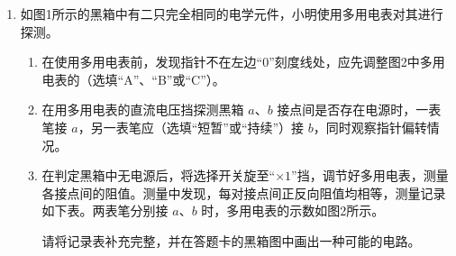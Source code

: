\documentclass[\gkver]{gaokaozhenti}
\begin{document}
\begin{enumerate}
{若粒子落在A点的右侧，其速度一定大于 $v_{0}$}
{若粒子落在A点左右两侧 $d$ 的范围内，其速度不可能小于 $v_{0}-\frac{qBd}{2m}$}
{若粒子落在A点左右两侧 $d$ 的范围内，其速度不可能大于 $v_{0}+\frac{qBd}{2m}$}

\item
如图1所示的黑箱中有二只完全相同的电学元件，小明使用多用电表对其进行探测。


\begin{enumerate}
	\item
	在使用多用电表前，发现指针不在左边“0”刻度线处，应先调整图2中多用电表的（选填“A”、“B”或“C”）。
	\item
	在用多用电表的直流电压挡探测黑箱 $a$、$b$ 接点间是否存在电源时，一表笔接 $a$，另一表笔应（选填“短暂”或“持续”）接 $b$，同时观察指针偏转情况。
	\item
	在判定黑箱中无电源后，将选择开关旋至“$\times1$”挡，调节好多用电表，测量各接点间的阻值。测量中发现，每对接点间正反向阻值均相等，测量记录如下表。两表笔分别接 $a$、$b$ 时，多用电表的示数如图2所示。
	
	请将记录表补充完整，并在答题卡的黑箱图中画出一种可能的电路。
	

\end{enumerate}
\end{enumerate}
\end{document}

